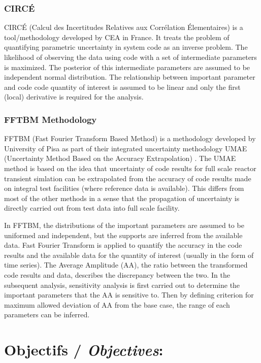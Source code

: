 \documentclass[11pt,titlepage]{article}
\begin{document}
\subsubsection{CIRCÉ}

CIRCÉ (Calcul des Incertitudes Relatives aux Corrélation Élementaires) is a tool/methodology developed by CEA in France. 
It treats the problem of quantifying parametric uncertainty in system code as an inverse problem. 
The likelihood of observing the data using code with a set of intermediate parameters is maximized. 
The posterior of this intermediate parameters are assumed to be independent normal distribution. 
The relationship between important parameter and code code quantity of interest is assumed to be linear and only the first (local) derivative is required for the analysis.

\subsubsection{FFTBM Methodology}

FFTBM (Fast Fourier Transform Based Method) is a methodology developed by University of Pisa as part of their integrated uncertainty methodology UMAE (Uncertainty Method Based on the Accuracy Extrapolation) \cite{Prosek2002,DAuria1998}. 
The UMAE method is based on the idea that uncertainty of code results for full scale reactor transient simlation can be extrapolated from the accuracy of code results made on integral test facilities (where reference data is available). 
This differs from most of the other methods in a sense that the propagation of uncertainty is directly carried out from test data into full scale facility.

In FFTBM, the distributions of the important parameters are assumed to be uniformed and independent, but the supports are inferred from the available data. 
Fast Fourier Transform is applied to quantify the accuracy in the code results and the available data for the quantity of interest (usually in the form of time series). 
The Average Amplitude (AA), the ratio between the transformed code results and data, describes the discrepancy between the two. 
In the subsequent analysis, sensitivity analysis is first carried out to determine the important parameters that the AA is sensitive to. 
Then by defining criterion for maximum allowed deviation of AA from the base case, the range of each parameters can be inferred.

\newpage
\section{Objectifs /  {\large\textit{Objectives}}:}
\end{document}
